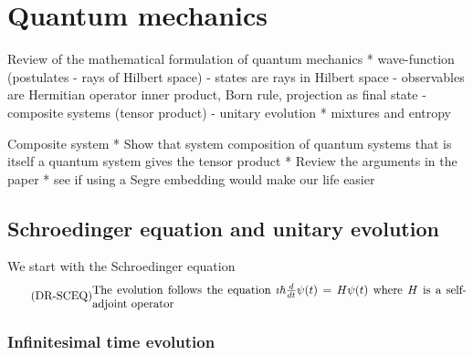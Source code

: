 

\def\>{\rangle}
\def\<{\langle}


\chapter{Quantum mechanics}


Review of the mathematical formulation of quantum mechanics
* wave-function (postulates - rays of Hilbert space)
- states are rays in Hilbert space
- observables are Hermitian operator inner product, Born rule, projection as final state
- composite systems (tensor product)
- unitary evolution
* mixtures and entropy

Composite system
* Show that system composition of quantum systems that is itself a quantum system gives the tensor product
* Review the arguments in the paper
* see if using a Segre embedding would make our life easier

\section{Schroedinger equation and unitary evolution}

We start with the Schroedinger equation
\begin{equation}\label{rp-qm-uev-condSchroedingerEq}
	\tag{DR-SCEQ}
	\eqtext{The evolution follows the equation $\imath \hbar \frac{d}{dt} \psi(t) = H \psi(t)$ where $H$ is a self-adjoint operator}
\end{equation}

\subsection{Infinitesimal time evolution}


